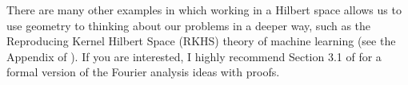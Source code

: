 \documentclass[11pt]{article}
\theoremstyle{plain}
\theoremstyle{definition}
\theoremstyle{remark}
\begin{document}
There are many other examples in which working in a Hilbert space allows us to use geometry to thinking about our problems in a deeper way, such as the Reproducing Kernel Hilbert Space (RKHS) theory of machine learning (see the Appendix of \citet{nonpar}). If you are interested, I highly recommend Section 3.1 of \citet{fourier} for a formal version of the Fourier analysis ideas with proofs.

\newpage

\vspace{5mm}

%


\newpage
\end{document}
